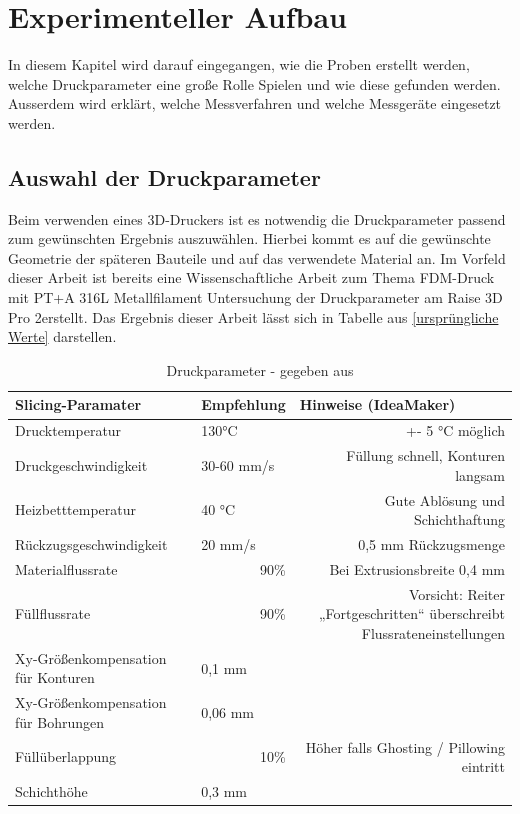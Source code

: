 \chapter{Experimenteller Aufbau}

In diesem Kapitel wird darauf eingegangen, wie die Proben erstellt werden, welche Druckparameter eine große Rolle Spielen und wie diese gefunden werden. Ausserdem wird erklärt, welche Messverfahren und welche Messgeräte eingesetzt werden.\\


\section{Auswahl der Druckparameter}

Beim verwenden eines 3D-Druckers ist es notwendig die Druckparameter passend zum gewünschten Ergebnis auszuwählen. Hierbei kommt es auf die gewünschte Geometrie der späteren Bauteile und auf das verwendete Material an. Im Vorfeld dieser Arbeit ist bereits eine Wissenschaftliche Arbeit zum Thema \glqq FDM-Druck mit PT+A 316L Metallfilament Untersuchung der Druckparameter am Raise 3D Pro 2\grqq erstellt. Das Ergebnis dieser Arbeit lässt sich in Tabelle aus \autoref{ursprüngliche Werte} darstellen.

\begin{table}[htbp]
    \centering
    \caption{Druckparameter - gegeben aus \autocite{M.Mickan}}
      \begin{tabular}{llr}
      \toprule
      \textbf{Slicing-Paramater} & \textbf{Empfehlung} & \multicolumn{1}{l|}{\textbf{Hinweise (IdeaMaker)}} \\
      \midrule
      Drucktemperatur & 130°C & \multicolumn{1}{p{12.555em}}{+- 5 °C möglich} \\
      Druckgeschwindigkeit & 30-60 mm/s & \multicolumn{1}{p{12.555em}}{Füllung schnell, Konturen langsam} \\
      Heizbetttemperatur & 40 °C & \multicolumn{1}{p{12.555em}}{Gute Ablösung und Schichthaftung} \\
      Rückzugsgeschwindigkeit & 20 mm/s & \multicolumn{1}{p{12.555em}}{0,5 mm Rückzugsmenge} \\
      Materialflussrate & \multicolumn{1}{r}{90\%} & \multicolumn{1}{p{12.555em}}{Bei Extrusionsbreite 0,4 mm} \\
      Füllflussrate & \multicolumn{1}{r}{90\%} & \multicolumn{1}{p{12.555em}}{Vorsicht: Reiter „Fortgeschritten“ überschreibt Flussrateneinstellungen} \\
      Xy-Größenkompensation für Konturen & 0,1 mm &  \\
      Xy-Größenkompensation für Bohrungen & 0,06 mm &  \\
      Füllüberlappung & \multicolumn{1}{r}{10\%} & \multicolumn{1}{p{12.555em}}{Höher falls Ghosting / Pillowing eintritt} \\
      Schichthöhe & 0,3 mm &  \\
      \bottomrule
      \end{tabular}%
    \label{ursprüngliche Werte}%
  \end{table}%
  
